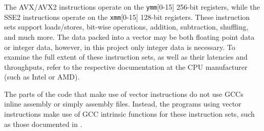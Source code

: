 The AVX/AVX2 instructions operate on the \texttt{ymm}[0-15] 256-bit registers, while the SSE2 instructions operate on the \texttt{xmm}[0-15] 128-bit registers. These instruction sets support loads/stores, bit-wise operations, addition, subtraction, shuffling, and much more. The data packed into a vector may be both floating point data or integer data, however, in this project only integer data is necessary. To examine the full extent of these instruction sets, as well as their latencies and throughputs, refer to the respective documentation at the CPU manufacturer (such as Intel or AMD).

The parts of the code that make use of vector instructions do not use GCCs inline assembly or simply assembly files. Instead, the programs using vector instructions make use of GCC intrinsic functions for these instruction sets, such as those documented in \cite{IntelIntr}.

\newpage
